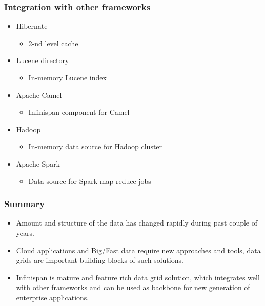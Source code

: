 \documentclass[10pt,utf8]{beamer}
\begin{document}
\begin{frame}
	\frametitle{Integration with other frameworks}
	\begin{itemize}
		\pause
		\item Hibernate
		\begin{itemize}
			\item 2-nd level cache
		\end{itemize}
		\pause
		\item Lucene directory
		\begin{itemize}
		 \item In-memory Lucene index 
		\end{itemize}
		\pause
		\item Apache Camel
		\begin{itemize}
		 \item Infinispan component for Camel
		\end{itemize}
		\pause
		\item Hadoop
		\begin{itemize}
			\item In-memory data source for Hadoop cluster
		\end{itemize}
		\pause
		\item Apache Spark
		\begin{itemize}
			\item Data source for Spark map-reduce jobs
		\end{itemize}
	\end{itemize}
\end{frame}

\begin{frame}
	\frametitle{Summary}
	\begin{itemize}
		\pause
		\item Amount and structure of the data has changed rapidly during past couple of years.
		\pause
		\item Cloud applications and Big/Fast data require new approaches and tools, data grids are important building blocks of such solutions.
		\pause
		\item Infinispan is mature and feature rich data grid solution, which integrates well with other frameworks and can be used as backbone for new 
	 generation of enterprise applications.
	\end{itemize}
\end{frame}
\end{document}
